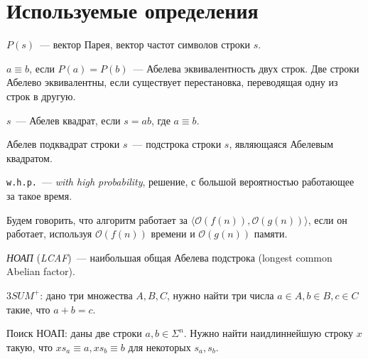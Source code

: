 \section{Используемые определения}

\begin{definition}
$P(s)$~--- вектор Парея, вектор частот символов строки $s$.
\end{definition}

\begin{definition}
$a \equiv b$, если $P(a) = P(b)$~--- Абелева эквивалентность двух строк. Две строки Абелево эквивалентны, если существует перестановка, переводящая одну из строк в другую.
\end{definition}

\begin{definition}
$s$~--- Абелев квадрат, если $s=ab$, где $a \equiv b$.
\end{definition}

\begin{definition}
Абелев подквадрат строки $s$~--- подстрока строки $s$, являющаяся Абелевым квадратом.
\end{definition}

\begin{definition}
\texttt{w.h.p.}~--- \textit{with high probability}, решение, с большой вероятностью работающее за такое время.
\end{definition}

\begin{definition}
Будем говорить, что алгоритм работает за $\langle \mathcal{O}(f(n)), \mathcal{O}(g(n)) \rangle$, если он работает, используя $\mathcal{O}(f(n))$ времени и  $\mathcal{O}(g(n))$ памяти.
\end{definition}

\begin{definition}
\textit{НОАП} (\textit{LCAF})~--- наибольшая общая Абелева подстрока (longest common Abelian factor).
\end{definition}

\begin{problem}
$3SUM^+$: дано три множества $A, B, C$, нужно найти три числа $a \in A, b \in B, c \in C$ такие, что $a+b=c$.
\end{problem}

\begin{problem}
Поиск НОАП: даны две строки $a, b \in \Sigma^n$. Нужно найти наидлиннейшую строку $x$ такую, что $xs_a \equiv a, xs_b \equiv b$ для некоторых $s_a, s_b$.
\end{problem}

